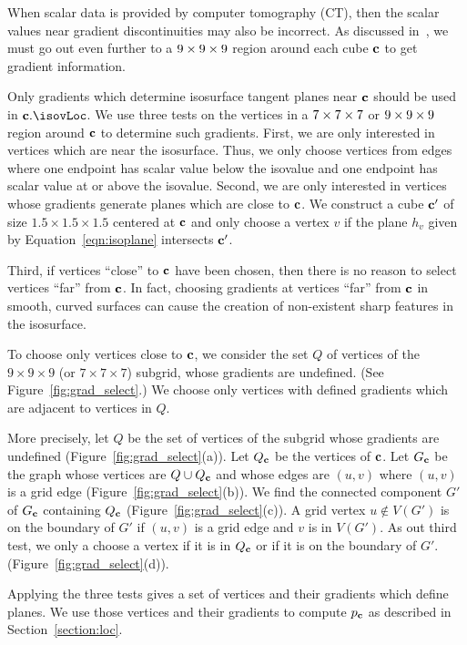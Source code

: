 When scalar data is provided by computer tomography (CT),
then the scalar values near gradient discontinuities
may also be incorrect.
As discussed in~\cite{bw-isifsd-15},
we must go out even further to a $9 \times 9 \times 9$ region 
around each cube $\mathbf{c}$ to get gradient information.

Only gradients which determine isosurface tangent planes near $\mathbf{c}$
should be used in $\cb.\isovLoc$.
We use three tests on the vertices in a $7 \times 7 \times 7$ or $9 \times 9 \times 9$
region around $\mathbf{c}$ to determine such gradients.
First, we are only interested in vertices which are near the isosurface.
Thus, we only choose vertices from edges
where one endpoint has scalar value below
the isovalue and one endpoint has scalar value at or above the isovalue.
Second, we are only interested in vertices whose gradients generate planes
which are close to $\mathbf{c}$.
We construct a cube $\mathbf{c}'$ of size $1.5 \times 1.5 \times 1.5$ centered at $\mathbf{c}$
and only choose a vertex $v$ 
if the plane $h_v$ given by Equation~\ref{eqn:isoplane}
intersects $\mathbf{c}'$.

Third, if vertices ``close'' to $\mathbf{c}$ have been chosen,
then there is no reason to select vertices ``far'' from $\mathbf{c}$.
In fact, choosing gradients at vertices ``far'' from $\mathbf{c}$
in smooth, curved surfaces can cause the creation 
of non-existent sharp features in the isosurface.

To choose only vertices close to $\mathbf{c}$,
we consider the set $Q$ of vertices 
of the $9 \times 9 \times 9$ (or $7 \times 7 \times 7$) subgrid,
whose gradients are undefined.
(See Figure~\ref{fig:grad_select}.)
We choose only vertices with defined gradients
which are adjacent to vertices in $Q$.

More precisely, let $Q$ be the set of vertices of the subgrid
whose gradients are undefined (Figure~\ref{fig:grad_select}(a)).
Let $Q_{\mathbf{c}}$ be the vertices of $\mathbf{c}$.
Let $G_{\mathbf{c}}$ be the graph whose vertices are $Q \cup Q_{\mathbf{c}}$
and whose edges are $(u,v)$ where $(u,v)$ is a grid edge
(Figure~\ref{fig:grad_select}(b)).
We find the connected component $G'$ of $G_{\mathbf{c}}$ containing $Q_{\mathbf{c}}$
(Figure~\ref{fig:grad_select}(c)).
A grid vertex $u \not\in V(G')$ is on the boundary of $G'$
if $(u,v)$ is a grid edge and $v$ is in $V(G')$.
As out third test, we only a choose a vertex if it is in $Q_{\mathbf{c}}$
or if it is on the boundary of $G'$.
(Figure~\ref{fig:grad_select}(d)).

Applying the three tests gives a set of vertices and their gradients
which define planes.
We use those vertices and their gradients to compute $p_{\mathbf{c}}$
as described in Section~\ref{section:loc}.


